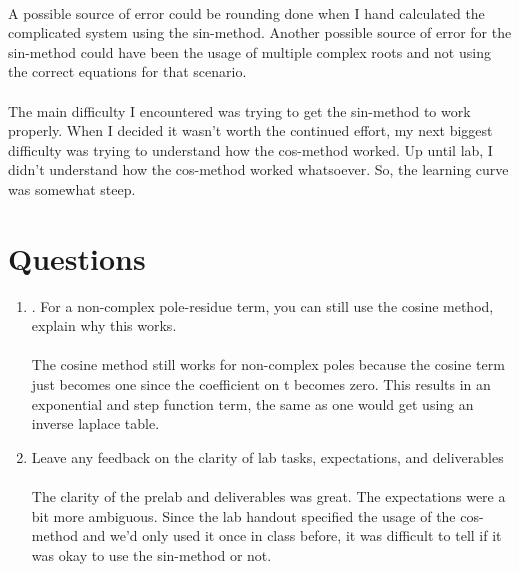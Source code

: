 \documentclass[12pt]{report}
\begin{document}
\paragraph{} A possible source of error could be rounding done when I hand calculated the complicated system using the sin-method. Another possible source of error for the sin-method could have been the usage of multiple complex roots and not using the correct equations for that scenario.  

\paragraph{} The main difficulty I encountered was trying to get the sin-method to work properly. When I decided it wasn't worth the continued effort, my next biggest difficulty was trying to understand how the cos-method worked. Up until lab, I didn't understand how the cos-method worked whatsoever. So, the learning curve was somewhat steep.  

\section{Questions} %
    \begin{enumerate}
        \item . For a non-complex pole-residue term, you can still use the cosine method, explain why this
works.
        \paragraph{} The cosine method still works for non-complex poles because the cosine term just becomes one since the coefficient on t becomes zero. This results in an exponential and step function term, the same as one would get using an inverse laplace table. 
        
        \item Leave any feedback on the clarity of lab tasks, expectations, and deliverables
        \paragraph{} The clarity of the prelab and deliverables was great. The expectations were a bit more ambiguous. Since the lab handout specified the usage of the cos-method and we'd only used it once in class before, it was difficult to tell if it was okay to use the sin-method or not.  
    \end{enumerate}
\end{document}
